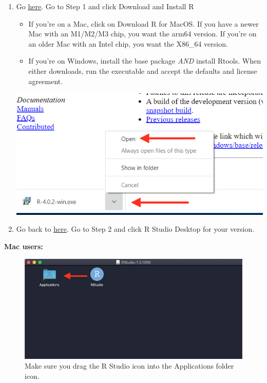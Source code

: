 \documentclass[
  letterpaper,
  DIV=11,
  numbers=noendperiod]{scrreprt}
\begin{document}
\begin{enumerate}
\def\labelenumi{\arabic{enumi}.}
\item
  Go \href{https://posit.co/download/rstudio-desktop/}{here}. Go to Step
  1 and click Download and Install R

  \begin{itemize}
  \item
    If you're on a Mac, click on Download R for MacOS. If you have a
    newer Mac with an M1/M2/M3 chip, you want the arm64 version. If
    you're on an older Mac with an Intel chip, you want the X86\_64
    version.
  \item
    If you're on Windows, install the base package \emph{AND} install
    Rtools. When either downloads, run the executable and accept the
    defaults and license agreement.
  \end{itemize}

  \includegraphics{./images/Screen Shot 2020-07-30 at 6.20.00 PM.png}
\item
  Go back to \href{https://posit.co/download/rstudio-desktop/}{here}. Go
  to Step 2 and click R Studio Desktop for your version.
\end{enumerate}

\textbf{Mac users:}

\begin{figure}

{\centering \includegraphics{./images/Screen Shot 2020-07-30 at 6.07.20 PM.png}

}

\caption{Make sure you drag the R Studio icon into the Applications
folder icon.}

\end{figure}
\end{document}
